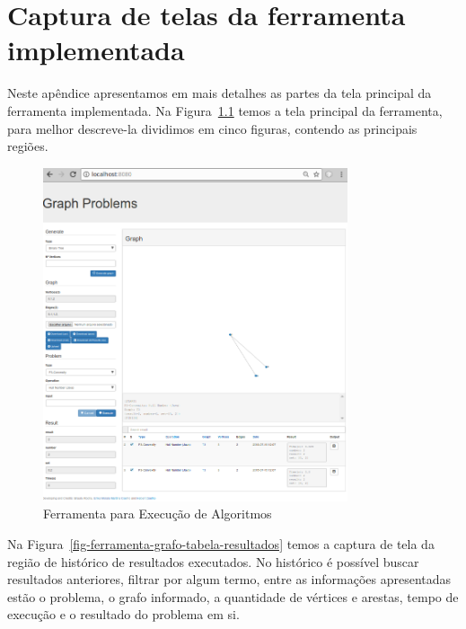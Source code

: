 \chapter{Captura de telas da ferramenta implementada}
\label{apend-ferramenta}

Neste apêndice apresentamos em mais detalhes as partes da tela principal da ferramenta implementada.
Na Figura~\ref{fig-ferramenta-grafo} temos a tela principal da ferramenta,
para melhor descreve-la dividimos em cinco figuras, contendo as principais regiões.

\begin{figure}[h]
	\begin{center}
	    \includegraphics[width=0.8\textwidth]{./imagens/ferramenta-tela-principal.png}
	\end{center}
   	\caption{Ferramenta para Execução de Algoritmos}
    \label{fig-ferramenta-grafo}
\end{figure}

Na Figura~\ref{fig-ferramenta-grafo-tabela-resultados} 
temos a captura de tela da região de histórico de resultados executados.
No histórico é possível buscar resultados anteriores,
filtrar por algum termo, entre as informações apresentadas estão o problema, o grafo informado, a quantidade de vértices e arestas,
tempo de execução e o resultado do problema em si.

